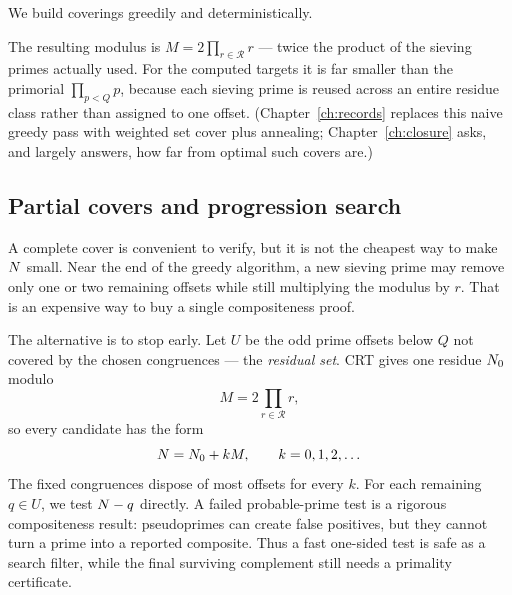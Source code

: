 We build coverings greedily and deterministically.

\medskip
\noindent{}
\medskip

The resulting modulus is $M=2\prod_{r\in\mathcal R}r$ --- twice the
product of the sieving primes actually used. For the computed targets it
is far smaller than the primorial $\prod_{p<Q}p$, because each sieving
prime is reused across an entire residue class rather than assigned to
one offset. (Chapter~\ref{ch:records} replaces this naive greedy pass
with weighted set cover plus annealing; Chapter~\ref{ch:closure} asks,
and largely answers, how far from optimal such covers are.)

\subsection{Partial covers and progression search}\label{sec:partial}

A complete cover is convenient to verify, but it is not the cheapest way
to make $N$ small. Near the end of the greedy algorithm, a new sieving
prime may remove only one or two remaining offsets while still
multiplying the modulus by $r$. That is an expensive way to buy a single
compositeness proof.

The alternative is to stop early. Let $U$ be the odd prime offsets below
$Q$ not covered by the chosen congruences --- the \emph{residual set}.
CRT gives one residue $N_0$ modulo
\[
M=2\prod_{r\in\mathcal R}r,
\]
so every candidate has the form
\begin{equation}\label{eq:progression}
N=N_0+kM,\qquad k=0,1,2,\dots
\end{equation}
The fixed congruences dispose of most offsets for every $k$. For each
remaining $q\in U$, we test $N-q$ directly. A failed probable-prime
test is a rigorous compositeness result: pseudoprimes can create false
positives, but they cannot turn a prime into a reported composite. Thus
a fast one-sided test is safe as a search filter, while the final
surviving complement still needs a primality certificate.

